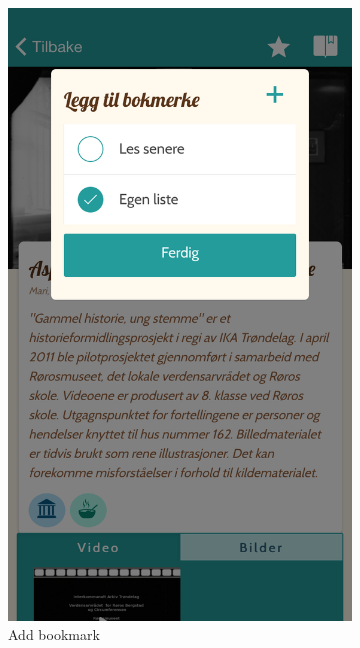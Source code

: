 \begin{appendices}
\begin{figure}[h]
\begin{subfigure}[h]{0.3\textwidth}
			\includegraphics[width=\textwidth]{fig/screenshot_bookmark}
			\caption{Add bookmark}
		\end{subfigure}
		\begin{subfigure}[h]{0.3\textwidth}

\end{subfigure}
\end{figure}
\end{appendices}
